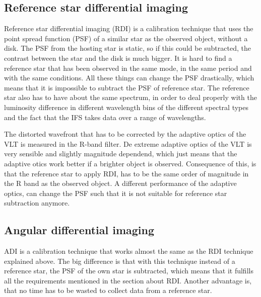 \documentclass[twoside,single]{lion-msc}
\begin{document}
\subsection{Reference star differential imaging}
Reference star differential imaging (RDI) is a calibration technique that uses the point spread function (PSF) of a similar star as the observed object, without a disk. The PSF from the hosting star is static, so if this could be subtracted, the contrast between the star and the disk is much bigger. It is hard to find a reference star that has been observed in the same mode, in the same period and with the same conditions. All these things can change the PSF drastically, which means that it is impossible to subtract the PSF of reference star. The reference star also has to have about the same spectrum, in order to deal properly with the luminosity difference in different wavelength bins of the different spectral types and the fact that the IFS takes data over a range of wavelengths. 
\bigskip

The distorted wavefront that has to be corrected by the adaptive optics of the VLT is measured in the R-band filter. De extreme adaptive optics of the VLT is very sensible and slightly magnitude dependend, which just means that the adaptive otics work better if a brighter object is observed. Consequence of this, is that the reference star to apply RDI, has to be the same order of magnitude in the R band as the observed object. A different performance of the adaptive optics, can change the PSF such that it is not suitable for reference star subtraction anymore. 

\subsection{Angular differential imaging}
ADI is a calibration technique that works almost the same as the RDI technique explained above. The big difference is that with this technique instead of a reference star, the PSF of the own star is subtracted, which means that it fulfills all the requirements mentioned in the section about RDI. Another advantage is, that no time has to be wasted to collect data from a reference star. 
\bigskip
\end{document}
